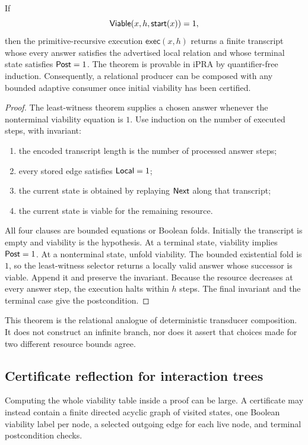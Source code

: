 \begin{theorem}
\label{thm:finite-use-compose}
If
\[
 \mathsf{Viable}(x,h,\mathsf{start}(x))=1,
\]
then the primitive-recursive execution $\mathsf{exec}(x,h)$ returns a finite transcript whose every answer satisfies the advertised local relation and whose terminal state satisfies $\mathsf{Post}=1$.  The theorem is provable in iPRA by quantifier-free induction.  Consequently, a relational producer can be composed with any bounded adaptive consumer once initial viability has been certified.
\end{theorem}

\begin{proof}
The least-witness theorem supplies a chosen answer whenever the nonterminal viability equation is $1$.  Use induction on the number of executed steps, with invariant:
\begin{enumerate}[label=(\roman*)]
\item the encoded transcript length is the number of processed answer steps;
\item every stored edge satisfies $\mathsf{Local}=1$;
\item the current state is obtained by replaying $\mathsf{Next}$ along that transcript;
\item the current state is viable for the remaining resource.
\end{enumerate}
All four clauses are bounded equations or Boolean folds.  Initially the transcript is empty and viability is the hypothesis.  At a terminal state, viability implies $\mathsf{Post}=1$.  At a nonterminal state, unfold viability.  The bounded existential fold is $1$, so the least-witness selector returns a locally valid answer whose successor is viable.  Append it and preserve the invariant.  Because the resource decreases at every answer step, the execution halts within $h$ steps.  The final invariant and the terminal case give the postcondition.
\end{proof}

This theorem is the relational analogue of deterministic transducer composition.  It does not construct an infinite branch, nor does it assert that choices made for two different resource bounds agree.

\subsection{Certificate reflection for interaction trees}

Computing the whole viability table inside a proof can be large.  A certificate may instead contain a finite directed acyclic graph of visited states, one Boolean viability label per node, a selected outgoing edge for each live node, and terminal postcondition checks.

